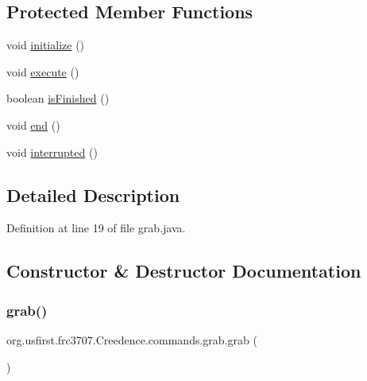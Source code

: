 \subsection*{Protected Member Functions}
\begin{DoxyCompactItemize}
\item 
void \mbox{\hyperlink{classorg_1_1usfirst_1_1frc3707_1_1_creedence_1_1commands_1_1grab_a16b5c137d0fa627790a4f0b9d7bd7034}{initialize}} ()
\item 
void \mbox{\hyperlink{classorg_1_1usfirst_1_1frc3707_1_1_creedence_1_1commands_1_1grab_a1b74f735e340066e58ae8a9580b4203f}{execute}} ()
\item 
boolean \mbox{\hyperlink{classorg_1_1usfirst_1_1frc3707_1_1_creedence_1_1commands_1_1grab_a9c8074b055fadb3a538fbbbf13b7c843}{is\+Finished}} ()
\item 
void \mbox{\hyperlink{classorg_1_1usfirst_1_1frc3707_1_1_creedence_1_1commands_1_1grab_a90b1c6bdb7b822a002c62463d64dc53e}{end}} ()
\item 
void \mbox{\hyperlink{classorg_1_1usfirst_1_1frc3707_1_1_creedence_1_1commands_1_1grab_adcc2108b19b16c8b6afc244cf7765a68}{interrupted}} ()
\end{DoxyCompactItemize}


\subsection{Detailed Description}


Definition at line 19 of file grab.\+java.



\subsection{Constructor \& Destructor Documentation}
\mbox{\label{classorg_1_1usfirst_1_1frc3707_1_1_creedence_1_1commands_1_1grab_ae8ee53243918011d49f2578bdaaf0fcb}} 
\subsubsection{\texorpdfstring{grab()}{grab()}}
{\footnotesize\ttfamily org.\+usfirst.\+frc3707.\+Creedence.\+commands.\+grab.\+grab (\begin{DoxyParamCaption}{ }\end{DoxyParamCaption})}



